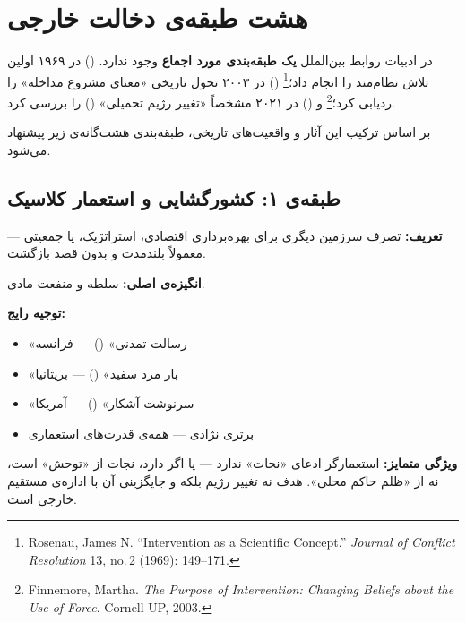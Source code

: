 \section{هشت طبقه‌ی دخالت خارجی}
\label{sec:tax-eight-types}

در ادبیات روابط بین‌الملل \textbf{یک طبقه‌بندی مورد اجماع} وجود ندارد.
 () در ۱۹۶۹ اولین تلاش نظام‌مند را
انجام داد؛\footnote{Rosenau, James N.  ``Intervention as a Scientific
Concept.'' \textit{Journal of Conflict Resolution} 13, no.\,2 (1969):
149--171.}  () در ۲۰۰۳
تحول تاریخی «معنای مشروع مداخله» را ردیابی کرد؛\footnote{Finnemore,
Martha.  \textit{The Purpose of Intervention: Changing Beliefs about the
Use of Force}.  Cornell UP, 2003.}
و  () در ۲۰۲۱ مشخصاً
«تغییر رژیم تحمیلی» () را بررسی کرد.

بر اساس ترکیب این آثار و واقعیت‌های تاریخی، طبقه‌بندی هشت‌گانه‌ی زیر
پیشنهاد می‌شود.


\subsection{طبقه‌ی ۱: کشورگشایی و استعمار کلاسیک}
\label{sec:tax-type1}

\begin{tcolorbox}[casebox, title={تعریف و ویژگی‌ها}]
\textbf{تعریف:} تصرف سرزمین دیگری برای بهره‌برداری اقتصادی، استراتژیک،
یا جمعیتی — معمولاً بلندمدت و بدون قصد بازگشت.

\textbf{انگیزه‌ی اصلی:} سلطه و منفعت مادی.

\textbf{توجیه رایج:}
\begin{itemize}
\item «رسالت تمدنی» () — فرانسه
\item «بار مرد سفید» () — بریتانیا
\item «سرنوشت آشکار» () — آمریکا
\item برتری نژادی — همه‌ی قدرت‌های استعماری
\end{itemize}

\textbf{ویژگی متمایز:} استعمارگر ادعای «نجات» ندارد — یا اگر دارد،
نجات از «توحش» است، نه از «ظلم حاکم محلی».  هدف نه تغییر رژیم بلکه
 و جایگزینی آن با اداره‌ی مستقیم خارجی است.
\end{tcolorbox}

